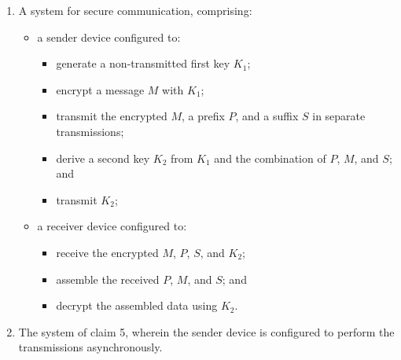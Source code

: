 \documentclass[11pt,letterpaper]{article}
\begin{document}
\begin{enumerate}[label=\textbf{\arabic*.}, leftmargin=0.5in, itemsep=0.4cm]
    \item A system for secure communication, comprising:
    \begin{itemize}[leftmargin=0.3in, noitemsep]
        \item a sender device configured to:
        \begin{itemize}[leftmargin=0.2in, noitemsep]
            \item generate a non-transmitted first key $K_1$;
            \item encrypt a message $M$ with $K_1$;
            \item transmit the encrypted $M$, a prefix $P$, and a suffix $S$ in separate transmissions;
            \item derive a second key $K_2$ from $K_1$ and the combination of $P$, $M$, and $S$; and
            \item transmit $K_2$;
        \end{itemize}
        \item a receiver device configured to:
        \begin{itemize}[leftmargin=0.2in, noitemsep]
            \item receive the encrypted $M$, $P$, $S$, and $K_2$;
            \item assemble the received $P$, $M$, and $S$; and
            \item decrypt the assembled data using $K_2$.
        \end{itemize}
    \end{itemize}

    \item The system of claim 5, wherein the sender device is configured to perform the transmissions asynchronously.
\end{enumerate}
\end{document}
